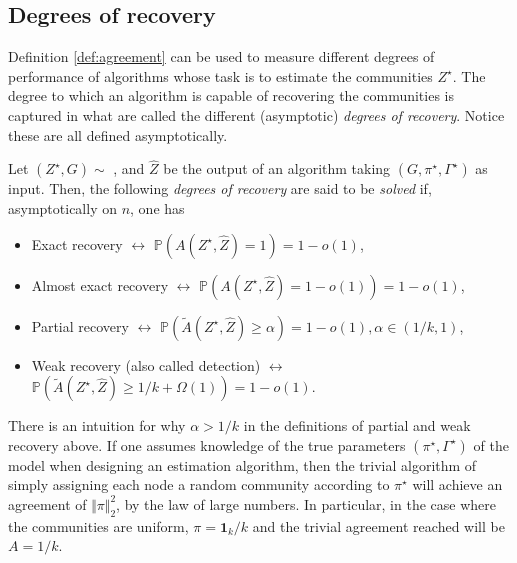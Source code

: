 \documentclass[../../main.tex]{subfiles} %
\begin{document}
\subsection{Degrees of recovery}

Definition \ref{def:agreement} can be used to measure different degrees of 
performance of algorithms whose task is to estimate the communities 
\(Z^\star\). The degree to which an algorithm is capable of recovering the 
communities is captured in what are called the different (asymptotic) 
\textit{degrees of recovery}. Notice these are all defined asymptotically.

\begin{definition}
	Let \((Z^\star, G) \sim\) , and \(\hat Z\) 
	be the 
	output of an algorithm taking \((G, \pi^\star, \Gamma^\star)\) as input. 
	Then, the following \textit{degrees of recovery} are said to be 
	\textit{solved} if, asymptotically on \(n\), one has
	\begin{itemize}
		\item Exact recovery \(\leftrightarrow\) \(\mathbb P (A(Z^\star, \hat 
		Z) = 1) = 1 - o(1)\),
		\item Almost exact recovery \(\leftrightarrow\) \(\mathbb P (A(Z^\star, 
		\hat Z) = 1 - o(1)) = 1 - o(1)\), 
		\item Partial recovery \(\leftrightarrow\) \(\mathbb P (\tilde 
		A(Z^\star, \hat 
		Z) \geq \alpha) = 1 - o(1), \alpha \in (1/k, 1)\),
		\item Weak recovery (also called detection) \(\leftrightarrow\) 
		\(\mathbb P (\tilde A (Z^\star, \hat 
		Z) \geq 1/k + \Omega(1)) = 1 - o(1)\).
	\end{itemize}
\end{definition}

\begin{remark}
	There is an intuition for why \(\alpha > 1/k\) in the definitions of 
	partial and weak recovery above. If one assumes knowledge of the true 
	parameters \((\pi^\star, \Gamma^\star)\) of the model when designing an 
	estimation algorithm, then the trivial algorithm of simply assigning each 
	node a random community according to \(\pi^\star\) will achieve an 
	agreement of \(\Vert \pi \Vert_2^2\), by the law of large numbers. In 
	particular, in the case where the communities are uniform, \(\pi = 
	\mathbf{1}_k / k\) and the trivial agreement reached will be \(A = 1/k\).
\end{remark}
\end{document}
